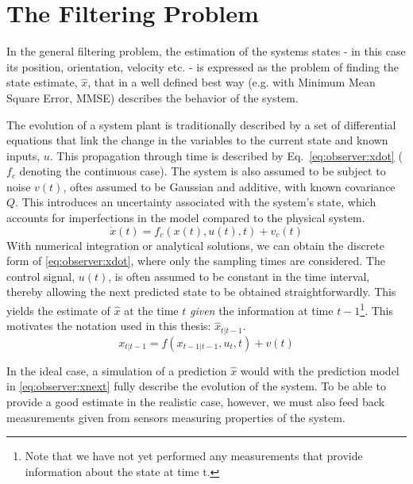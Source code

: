 \section{The Filtering Problem}
\label{sec:observer:filtering}
    In the general filtering problem, the estimation of the systems states - in this case
    its position, orientation, velocity etc. - is
    expressed as the problem of finding the state estimate,
    $\hat{x}$, that in a well defined best way (e.g. with Minimum Mean Square Error, MMSE)
    describes the behavior of the system.

    The evolution of a system plant is traditionally described by a set of differential equations
    that link the change in the variables to the current state and known inputs, $u$.
    This propagation through time is described by Eq.~\eqref{eq:observer:xdot} ($f_{c}$ denoting the continuous case).
    The system is also assumed to be subject to noise $v(t)$, oftes assumed to
    be Gaussian and additive, with known covariance $Q$.
    This introduces an uncertainty associated with the system's state, which accounts
    for imperfections in the model compared to the physical system.
    \begin{equation}
        \label{eq:observer:xdot}
        \dot{x}(t) = f_{c}(x(t),u(t),t) + v_{c}(t)
    \end{equation}
    With numerical integration or analytical solutions, we can obtain the discrete form of
    \eqref{eq:observer:xdot}, where only the sampling times are considered.
    The control signal, $u(t)$, is often assumed to be constant in the time interval,
    thereby allowing the next predicted state to be obtained straightforwardly.
    This yields the estimate of $\hat{x}$ at the time $t$ \textit{given} the information at time
    $t-1$\footnote{Note that we have not yet performed any measurements that provide information about the state at time t.}.
    This motivates the notation used in this thesis: $\hat{x}_{t|t-1}$.
    \begin{equation}
        \label{eq:observer:xnext}
        x_{t|t-1} = f(x_{t-1|t-1},u_{t},t) + v(t)
    \end{equation}

    In the ideal case, a simulation of a prediction $\hat{x}$ would
    with the prediction model in \eqref{eq:observer:xnext} fully describe
    the evolution of the system.
    To be able to provide a good estimate in the realistic case, however,
    we must also feed back measurements given from sensors measuring
    properties of the system.


